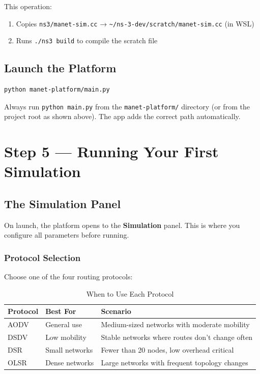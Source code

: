 \documentclass[12pt,a4paper]{article}
\newenvironment{notebox}
  {\begin{tcolorbox}[
      colback   = infoblue!8,
      colframe  = infoblue,
      fonttitle = \bfseries,
      title     = \textcolor{infoblue}{$\blacktriangleright$\; Note},
      breakable
  ]}
  {\end{tcolorbox}}
\newcommand{\cmd}[1]{\texttt{\color{codeblue}#1}}
\newcommand{\file}[1]{\texttt{\color{codered}#1}}
\begin{document}
This operation:
\begin{enumerate}[leftmargin=1.5em]
  \item Copies \file{ns3/manet-sim.cc} → \cmd{\textasciitilde/ns-3-dev/scratch/manet-sim.cc} (in WSL)
  \item Runs \cmd{./ns3 build} to compile the scratch file
\end{enumerate}

\subsection{Launch the Platform}

\begin{lstlisting}[style=bash, caption={Launch MANET Research Platform}]
python manet-platform/main.py
\end{lstlisting}

\begin{notebox}
Always run \cmd{python main.py} from the \file{manet-platform/} directory (or from the project root as shown above). The app adds the correct path automatically.
\end{notebox}


\section{Step 5 — Running Your First Simulation}

\subsection{The Simulation Panel}

On launch, the platform opens to the \textbf{Simulation} panel. This is where you configure all parameters before running.

\subsubsection{Protocol Selection}

Choose one of the four routing protocols:

\begin{table}[H]
\centering
\caption{When to Use Each Protocol}
\begin{tabular}{llp{7cm}}
\toprule
\textbf{Protocol} & \textbf{Best For} & \textbf{Scenario} \\
\midrule
AODV  & General use     & Medium-sized networks with moderate mobility \\
DSDV  & Low mobility    & Stable networks where routes don't change often \\
DSR   & Small networks  & Fewer than 20 nodes, low overhead critical \\
OLSR  & Dense networks  & Large networks with frequent topology changes \\
\bottomrule
\end{tabular}
\end{table}
\end{document}
